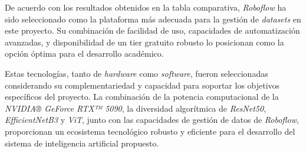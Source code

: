 De acuerdo con los resultados obtenidos en la tabla comparativa, \textit{Roboflow} ha sido seleccionado como la plataforma más adecuada para la gestión de \textit{datasets} en este proyecto. Su combinación de facilidad de uso, capacidades de automatización avanzadas, y disponibilidad de un tier gratuito robusto lo posicionan como la opción óptima para el desarrollo académico.

Estas tecnologías, tanto de \textit{hardware} como \textit{software}, fueron seleccionadas considerando su complementariedad y capacidad para soportar los objetivos específicos del proyecto. La combinación de la potencia computacional de la \textit{NVIDIA® GeForce RTX™ 5090}, la diversidad algorítmica de \textit{ResNet50}, \textit{EfficientNetB3} y \textit{ViT}, junto con las capacidades de gestión de datos de \textit{Roboflow}, proporcionan un ecosistema tecnológico robusto y eficiente para el desarrollo del sistema de inteligencia artificial propuesto.